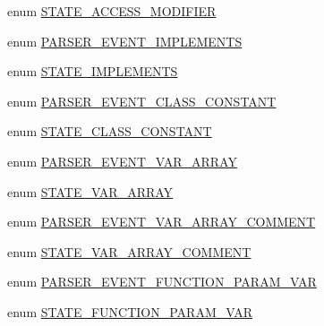 \begin{DoxyCompactItemize}
\item 
enum \hyperlink{_parser_8inc_a1eef3b1b97a9b4706ae6244038ab840a}{\-S\-T\-A\-T\-E\-\_\-\-A\-C\-C\-E\-S\-S\-\_\-\-M\-O\-D\-I\-F\-I\-E\-R} 
\item 
enum \hyperlink{_parser_8inc_a3c9d272a1d6df19c276ad42aa7b86a2f}{\-P\-A\-R\-S\-E\-R\-\_\-\-E\-V\-E\-N\-T\-\_\-\-I\-M\-P\-L\-E\-M\-E\-N\-T\-S} 
\item 
enum \hyperlink{_parser_8inc_a609b2135c93fe2c2330db2529833115f}{\-S\-T\-A\-T\-E\-\_\-\-I\-M\-P\-L\-E\-M\-E\-N\-T\-S} 
\item 
enum \hyperlink{_parser_8inc_a5c14e76aa9482a3de141689dd38ca65f}{\-P\-A\-R\-S\-E\-R\-\_\-\-E\-V\-E\-N\-T\-\_\-\-C\-L\-A\-S\-S\-\_\-\-C\-O\-N\-S\-T\-A\-N\-T} 
\item 
enum \hyperlink{_parser_8inc_a7f94140e1e20a079694673e5ef97622d}{\-S\-T\-A\-T\-E\-\_\-\-C\-L\-A\-S\-S\-\_\-\-C\-O\-N\-S\-T\-A\-N\-T} 
\item 
enum \hyperlink{_parser_8inc_abb8be1c6a32a53af42e4a75bb383c159}{\-P\-A\-R\-S\-E\-R\-\_\-\-E\-V\-E\-N\-T\-\_\-\-V\-A\-R\-\_\-\-A\-R\-R\-A\-Y} 
\item 
enum \hyperlink{_parser_8inc_a6d5059571bdb3c9775a455a97d624fdd}{\-S\-T\-A\-T\-E\-\_\-\-V\-A\-R\-\_\-\-A\-R\-R\-A\-Y} 
\item 
enum \hyperlink{_parser_8inc_aad9764eef0789d07a7f021f2b46d1be1}{\-P\-A\-R\-S\-E\-R\-\_\-\-E\-V\-E\-N\-T\-\_\-\-V\-A\-R\-\_\-\-A\-R\-R\-A\-Y\-\_\-\-C\-O\-M\-M\-E\-N\-T} 
\item 
enum \hyperlink{_parser_8inc_aef5a13e3be07f3b4e06652c742b7c25a}{\-S\-T\-A\-T\-E\-\_\-\-V\-A\-R\-\_\-\-A\-R\-R\-A\-Y\-\_\-\-C\-O\-M\-M\-E\-N\-T} 
\item 
enum \hyperlink{_parser_8inc_a47e2481aaae26a10e74447a59d8c558e}{\-P\-A\-R\-S\-E\-R\-\_\-\-E\-V\-E\-N\-T\-\_\-\-F\-U\-N\-C\-T\-I\-O\-N\-\_\-\-P\-A\-R\-A\-M\-\_\-\-V\-A\-R} 
\item 
enum \hyperlink{_parser_8inc_ab5b4aedbc4993b460054ac8c9bd99171}{\-S\-T\-A\-T\-E\-\_\-\-F\-U\-N\-C\-T\-I\-O\-N\-\_\-\-P\-A\-R\-A\-M\-\_\-\-V\-A\-R} 
\end{DoxyCompactItemize}


